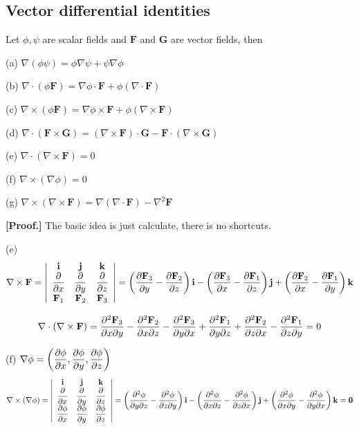 \begin{spacing}{1.3}
    \newpage
    \subsection{Vector differential identities}
    Let $\phi, \psi$ are scalar fields and $\mathbf{F}$ and $\mathbf{G}$ are vector fields, then

    (a) $\nabla(\phi \psi)=\phi \nabla \psi+\psi \nabla \phi$

    (b) $\nabla \cdot(\phi \mathbf{F})=\nabla \phi \cdot \mathbf{F}+\phi(\nabla \cdot \mathbf{F})$

    (c) $\nabla \times(\phi \mathbf{F})=\nabla \phi \times \mathbf{F}+\phi(\nabla \times \mathbf{F})$

    (d) $\nabla \cdot(\mathbf{F} \times \mathbf{G})=(\nabla \times \mathbf{F}) \cdot \mathbf{G}-\mathbf{F} \cdot(\nabla \times \mathbf{G})$
    
    (e) $\nabla \cdot(\nabla \times \mathbf{F})=0$
    
    (f) $\nabla \times(\nabla \phi)=0$
    
    (g) $\nabla \times(\nabla \times \mathbf{F})=\nabla(\nabla \cdot \mathbf{F})-\nabla^{2} \mathbf{F}$

    \vspace{0.2in}
    {\bf [Proof.]} {\blue The basic idea is just calculate, there is no shortcuts.}

    (e) $$\nabla \times {\bf F} = \left|\begin{array}{ccc}
        {\bf i} & {\bf j} & {\bf k} \\
        \dfrac{\partial }{\partial x} & \dfrac{\partial }{\partial y} & \dfrac{\partial }{\partial z}\\
        {\bf F}_1 & {\bf F}_2 & {\bf F}_3
    \end{array} \right| 
    = \left(\frac{\partial {\bf F}_3}{\partial y}-\frac{\partial {\bf F}_2}{\partial z}\right) {\bf i} -
    \left(\frac{\partial {\bf F}_3}{\partial x}-\frac{\partial {\bf F}_1}{\partial z}\right) {\bf j} + 
    \left(\frac{\partial {\bf F}_2}{\partial x}-\frac{\partial {\bf F}_1}{\partial y}\right) {\bf k} $$

    $$\nabla\cdot (\nabla\times {\bf F})=
    \frac{\partial^2 {\bf F}_3}{\partial x\partial y}-\frac{\partial^2 {\bf F}_2}{\partial x\partial z}-\frac{\partial^2 {\bf F}_3}{\partial y \partial x}
    +\frac{\partial^2 {\bf F}_1}{\partial y\partial z}+\frac{\partial^2 {\bf F}_2}{\partial z\partial x}-\frac{\partial^2 {\bf F}_1}{\partial z \partial y}=0$$

    (f) $\displaystyle \nabla \phi=\left(\frac{\partial \phi}{\partial x},\frac{\partial \phi}{\partial y},\frac{\partial \phi}{\partial z}\right)$
    $$\nabla \times (\nabla \phi)=\left|\begin{array}{ccc}
        {\bf i} & {\bf j} & {\bf k} \\
        \dfrac{\partial }{\partial x} & \dfrac{\partial }{\partial y} & \dfrac{\partial }{\partial z}\\
        \dfrac{\partial \phi}{\partial x} & \dfrac{\partial \phi}{\partial y} & \dfrac{\partial \phi}{\partial z}
    \end{array} \right|
    =\left(\frac{\partial^2 \phi}{\partial y \partial z}-\frac{\partial^2 \phi}{\partial z \partial y}\right){\bf i} -
    \left(\frac{\partial^2 \phi}{\partial x \partial z}-\frac{\partial^2 \phi}{\partial z \partial x}\right){\bf j} +
    \left(\frac{\partial^2 \phi}{\partial x \partial y}-\frac{\partial^2 \phi}{\partial y \partial x}\right){\bf k}
    ={\bf 0}$$


\end{spacing}
